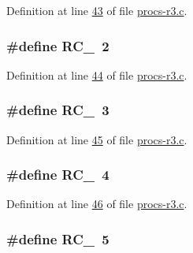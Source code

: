 Definition at line \hyperlink{procs-r3_8c_source_l00043}{43} of file \hyperlink{procs-r3_8c_source}{procs-\/r3.c}.

\hypertarget{procs-r3_8c_aecb625779f85a782d04475c4fb74ebc5}{
\subsubsection[{RC\_\-2}]{\setlength{\rightskip}{0pt plus 5cm}\#define RC\_~2}}
\label{procs-r3_8c_aecb625779f85a782d04475c4fb74ebc5}


Definition at line \hyperlink{procs-r3_8c_source_l00044}{44} of file \hyperlink{procs-r3_8c_source}{procs-\/r3.c}.

\hypertarget{procs-r3_8c_acf180d856b90414b8bed369054fcd763}{
\subsubsection[{RC\_\-3}]{\setlength{\rightskip}{0pt plus 5cm}\#define RC\_~3}}
\label{procs-r3_8c_acf180d856b90414b8bed369054fcd763}


Definition at line \hyperlink{procs-r3_8c_source_l00045}{45} of file \hyperlink{procs-r3_8c_source}{procs-\/r3.c}.

\hypertarget{procs-r3_8c_ac76d64b147c7d9537915e51c7dc02bc1}{
\subsubsection[{RC\_\-4}]{\setlength{\rightskip}{0pt plus 5cm}\#define RC\_~4}}
\label{procs-r3_8c_ac76d64b147c7d9537915e51c7dc02bc1}


Definition at line \hyperlink{procs-r3_8c_source_l00046}{46} of file \hyperlink{procs-r3_8c_source}{procs-\/r3.c}.

\hypertarget{procs-r3_8c_acba6a931785dc419ad6337bc9c1a24f8}{
\subsubsection[{RC\_\-5}]{\setlength{\rightskip}{0pt plus 5cm}\#define RC\_~5}}
\label{procs-r3_8c_acba6a931785dc419ad6337bc9c1a24f8}


